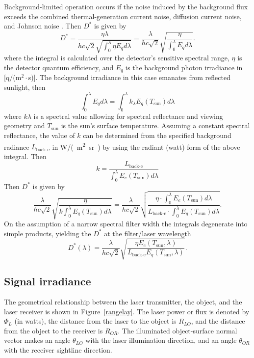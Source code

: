 Background-limited operation occurs if the noise induced by the background flux exceeds the combined thermal-generation current noise, diffusion current noise, and Johnson noise \cite[Section 5.9.5.1]{Willers2013}. Then $D^\ast$ is given by 
\begin{equation}
D^\ast  = \frac
{\eta \lambda}
{hc\sqrt{2}\sqrt{   \int_0^{\lambda}\eta E_q d\lambda  } }
=
\frac
{\lambda} {hc\sqrt{2}}\sqrt{ \frac{\eta}{ \int_0^{\lambda} E_q d\lambda}}.
\label{backqq}
\end{equation}
where the integral is calculated over the detector's sensitive spectral range, 
$\eta$ is the detector quantum efficiency, and $E_q$ 
is the  background photon irradiance in [q/(m$^2\cdot$s)].
The background irradiance in this case emanates from reflected sunlight, then 
\begin{equation}
\int_0^{\lambda} E_q d\lambda=\int_0^{\lambda}k_\lambda E_q (T_\textrm{sun}) d\lambda
\end{equation}
where $k\lambda$ is a spectral value allowing for spectral reflectance and viewing geometry and $T_\textrm{sun}$ is the sun's surface temperature. Assuming a constant spectral reflectance, the value of $k$ can be determined from the specified background radiance $L_\textrm{back-e}$ in \si{\watt/(\metre\squared.\steradian)} by using the radiant (watt) form of the above integral. Then 
\begin{equation}
k=\frac{L_\textrm{back-e}}{\int_0^{\lambda} E_e (T_\textrm{sun}) d\lambda}
\end{equation}
Then $D^\ast$ is given by
\begin{equation}
\frac
{\lambda} {hc\sqrt{2}}\sqrt{ \frac{\eta}{ k\int_0^{\lambda} E_q (T_\textrm{sun}) d\lambda}}
=\frac
{\lambda} {hc\sqrt{2}}
\sqrt{\frac{\eta\cdot\int_0^{\lambda} E_e (T_\textrm{sun}) d\lambda}{L_\textrm{back-e}\cdot\int_0^{\lambda}E_q (T_\textrm{sun}) d\lambda}}.
\label{backqqaa}
\end{equation}
On the assumption of a narrow spectral filter width the integrals degenerate into simple products, yielding the $D^\ast$ at the filter/laser wavelength
\begin{equation}
D^\ast(\lambda)
=\frac
{\lambda} {hc\sqrt{2}}
\sqrt{\frac{\eta E_e (T_\textrm{sun},\lambda)}{L_\textrm{back-e}E_q (T_\textrm{sun},\lambda) }}.
\label{backqqab}
\end{equation}


\subsection{Signal irradiance}
\noindent
The geometrical relationship between the laser transmitter, the object, and the laser receiver is shown in Figure~\ref{rangelay}. The laser power or flux is denoted by $\Phi_L$ (in watts), the distance from the laser to the object is $R_{LO}$, and the distance from the object to the receiver is $R_{OR}$. The illuminated object-surface normal vector makes an angle $\theta_{LO}$ with the laser illumination direction, and an angle $\theta_{OR}$ with the receiver sightline direction.

